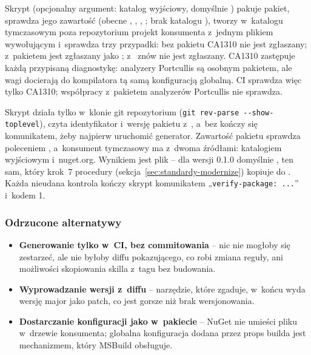 Skrypt  (opcjonalny argument: katalog wyjściowy, domyślnie
) pakuje pakiet, sprawdza jego zawartość (obecne
, , , ;
brak katalogu ), tworzy w~katalogu tymczasowym poza repozytorium projekt
konsumenta z~jednym plikiem wywołującym  i~sprawdza
trzy przypadki: bez pakietu CA1310 nie jest zgłaszany; z~pakietem jest zgłaszany jako
; z~ znów nie jest zgłaszany.
CA1310 zastępuje każdą przypisaną diagnostykę: analyzery Portcullis są osobnym pakietem, ale
wagi docierają do kompilatora tą samą konfiguracją globalną. CI sprawdza więc tylko CA1310;
współpracy z~pakietem analyzerów Portcullis nie sprawdza.

Skrypt działa tylko w~klonie git repozytorium (\texttt{git rev-parse -{}-show-toplevel}),
czyta identyfikator i~wersję pakietu z~, a~bez
 kończy się komunikatem, żeby najpierw
uruchomić generator. Zawartość pakietu sprawdza poleceniem , a~konsument
tymczasowy ma  z~dwoma źródłami: katalogiem wyjściowym i~nuget.org.
Wynikiem jest plik  -- dla wersji 0.1.0
domyślnie , ten sam, który krok~7
procedury (sekcja~\ref{sec:standardy-modernize}) kopiuje do . Każda
nieudana kontrola kończy skrypt komunikatem „\texttt{verify-package: ...}” i~kodem 1.

\subsubsection{Odrzucone alternatywy}

\begin{itemize}
  \item \textbf{Generowanie tylko w~CI, bez commitowania} -- nic nie mogłoby się zestarzeć, ale
        nie byłoby diffu pokazującego, co robi zmiana reguły, ani możliwości skopiowania
        skilla z~tagu bez budowania.
  \item \textbf{Wyprowadzanie wersji z~diffu} -- narzędzie, które zgaduje, w~końcu wyda wersję
        major jako patch, co jest gorsze niż brak wersjonowania.
  \item \textbf{Dostarczanie konfiguracji jako  w~pakiecie} -- NuGet
        nie umieści pliku  w~drzewie konsumenta; globalna konfiguracja
        dodana przez props builda jest mechanizmem, który MSBuild obsługuje.
\end{itemize}

